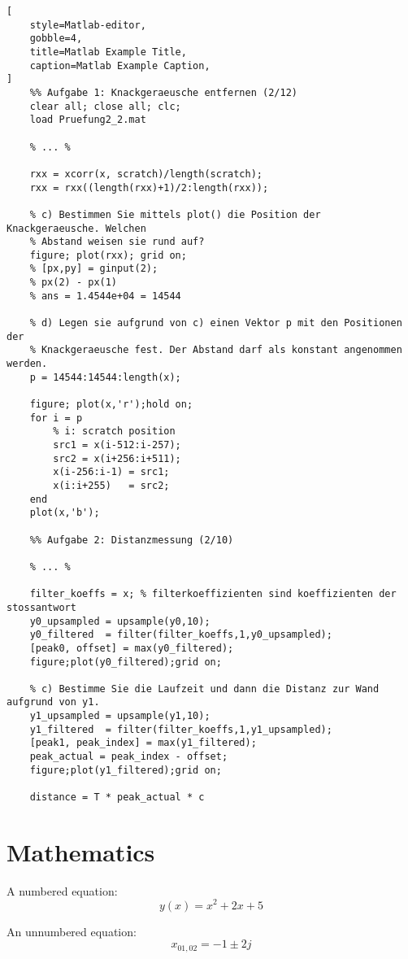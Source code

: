 \documentclass[a4paper,11pt,oneside,showtrims]{alpenthesis}
\begin{document}
\begin{lstlisting}[
    style=Matlab-editor,
    gobble=4,
    title=Matlab Example Title,
    caption=Matlab Example Caption,
]
    %% Aufgabe 1: Knackgeraeusche entfernen (2/12)
    clear all; close all; clc;
    load Pruefung2_2.mat

    % ... %

    rxx = xcorr(x, scratch)/length(scratch);
    rxx = rxx((length(rxx)+1)/2:length(rxx));

    % c) Bestimmen Sie mittels plot() die Position der Knackgeraeusche. Welchen
    % Abstand weisen sie rund auf?
    figure; plot(rxx); grid on;
    % [px,py] = ginput(2);
    % px(2) - px(1)
    % ans = 1.4544e+04 = 14544

    % d) Legen sie aufgrund von c) einen Vektor p mit den Positionen der
    % Knackgeraeusche fest. Der Abstand darf als konstant angenommen werden.
    p = 14544:14544:length(x);

    figure; plot(x,'r');hold on;
    for i = p
        % i: scratch position
        src1 = x(i-512:i-257);
        src2 = x(i+256:i+511);
        x(i-256:i-1) = src1;
        x(i:i+255)   = src2;
    end
    plot(x,'b');

    %% Aufgabe 2: Distanzmessung (2/10)

    % ... %

    filter_koeffs = x; % filterkoeffizienten sind koeffizienten der stossantwort
    y0_upsampled = upsample(y0,10);
    y0_filtered  = filter(filter_koeffs,1,y0_upsampled);
    [peak0, offset] = max(y0_filtered);
    figure;plot(y0_filtered);grid on;

    % c) Bestimme Sie die Laufzeit und dann die Distanz zur Wand aufgrund von y1.
    y1_upsampled = upsample(y1,10);
    y1_filtered  = filter(filter_koeffs,1,y1_upsampled);
    [peak1, peak_index] = max(y1_filtered);
    peak_actual = peak_index - offset;
    figure;plot(y1_filtered);grid on;

    distance = T * peak_actual * c
\end{lstlisting}

\chapter{Mathematics} %

A numbered equation:
\begin{equation}
    y(x) = x^2 + 2x + 5
\end{equation}

An unnumbered equation:
\begin{equation*}
    x_{01,02} = -1 \pm 2j
\end{equation*}
\end{document}
